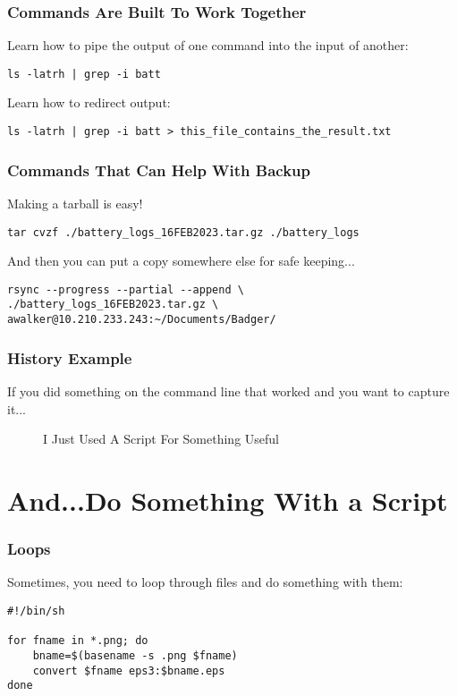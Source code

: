 \documentclass{beamer}
\begin{document}
\begin{frame}[fragile]\frametitle{Commands Are Built To Work Together}
  Learn how to pipe the output of one command into the input of another:

\begin{verbatim}
ls -latrh | grep -i batt
\end{verbatim}

Learn how to redirect output:

\begin{verbatim}
ls -latrh | grep -i batt > this_file_contains_the_result.txt
\end{verbatim}


\end{frame}

\begin{frame}[fragile]\frametitle{Commands That Can Help With Backup}
  Making a tarball is easy!

\begin{verbatim}
tar cvzf ./battery_logs_16FEB2023.tar.gz ./battery_logs
\end{verbatim}

And then you can put a copy somewhere else for safe keeping...

\begin{verbatim}
rsync --progress --partial --append \
./battery_logs_16FEB2023.tar.gz \
awalker@10.210.233.243:~/Documents/Badger/
\end{verbatim}


\end{frame}

\begin{frame}\frametitle{History Example}
    If you did something on the command line that worked and you want to capture it...

  \begin{figure}[!htb]
    \linewidth
    \begin{center}
    \end{center}
    \caption{I Just Used A Script For Something Useful}\label{fig:history-grep-example}
  \end{figure}
\end{frame}

\section{And...Do Something With a Script}
\begin{frame}[fragile]\frametitle{Loops}
  Sometimes, you need to loop through files and do something with them:
\begin{verbatim}
#!/bin/sh

for fname in *.png; do
    bname=$(basename -s .png $fname)
    convert $fname eps3:$bname.eps
done
\end{verbatim}
\end{frame}
\end{document}
